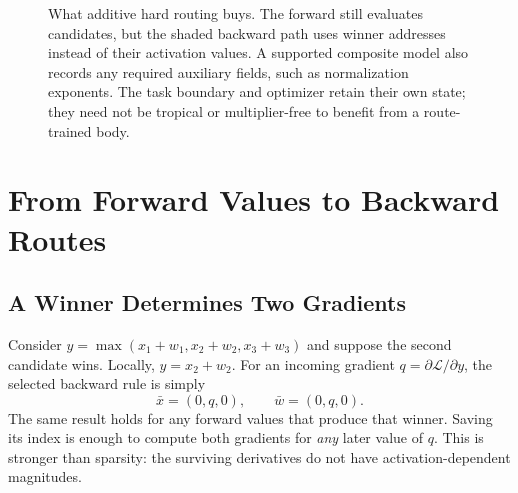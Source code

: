 \documentclass{article}
\theoremstyle{plain}
\theoremstyle{definition}
\theoremstyle{remark}
\begin{document}
\begin{figure}[t]
\centering
{}
\caption{What additive hard routing buys. The forward still evaluates
candidates, but the shaded backward path uses winner addresses instead of
their activation values. A supported composite model also records any
required auxiliary fields, such as normalization exponents. The task
boundary and optimizer retain their own state; they need not be tropical or
multiplier-free to benefit from a route-trained body.}
\label{fig:contracts}
\end{figure}

\section{From Forward Values to Backward Routes}
\label{sec:contract}

\subsection{A Winner Determines Two Gradients}

Consider $y=\max(x_1+w_1,x_2+w_2,x_3+w_3)$ and suppose the second
candidate wins. Locally, $y=x_2+w_2$. For an incoming gradient
$q=\partial\mathcal{L}/\partial y$, the selected backward rule is simply
\begin{equation}
 \bar x=(0,q,0),\qquad \bar w=(0,q,0).
 \label{eq:worked-route}
\end{equation}
The same result holds for any forward values that produce that winner.
Saving its index is enough to compute both gradients for \emph{any} later
value of $q$. This is stronger than sparsity: the surviving derivatives do
not have activation-dependent magnitudes.
\end{document}
